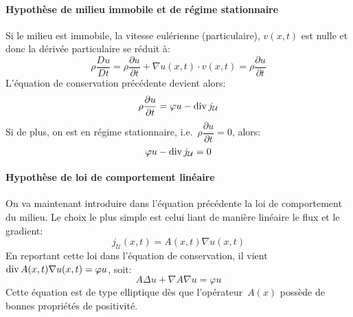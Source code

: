 \paragraph{Hypothèse de milieu immobile et de régime stationnaire}
Si le milieu est immobile, la vitesse eulérienne (particulaire), $v(x, t)$ est nulle et donc la dérivée particulaire se réduit à:
\begin{equation}\rho\dfrac{Du}{Dt}=\rho\dfrac{\partial u}{\partial t}+\nabla u(x,t)\cdot v(x,t)=\rho\dfrac{\partial u}{\partial t}\end{equation}
L'équation de conservation précédente devient alors:
\begin{equation}
\rho \dfrac{\partial u}{\partial t} = \varphi u-\operatorname{div} j_{\mathcal{U}}
\end{equation}
Si de plus, on est en régime stationnaire, i.e.~$\rho \dfrac{\partial u}{\partial t} =0$, alors:
\begin{equation}
\varphi u-\operatorname{div} j_{\mathcal{U}} =0
\end{equation}

\medskip
\paragraph{Hypothèse de loi de comportement linéaire}
On va maintenant introduire dans l'équation précédente la loi de comportement du milieu.
Le choix le plus simple est celui liant de manière linéaire le flux et le gradient:
\begin{equation}
j_{\mathcal{U}}(x,t)=A(x,t)\nabla u(x,t)
\end{equation}
En reportant cette loi dans l'équation de conservation, il vient~$\operatorname{div} A(x,t)\nabla u(x,t)=\varphi u$, soit:
\begin{equation}
A \Delta u + \nabla A \nabla u = \varphi u
\end{equation}
Cette équation est de type elliptique dès que l'opérateur~$A(x)$ possède de bonnes propriétés de positivité.

\medskip
